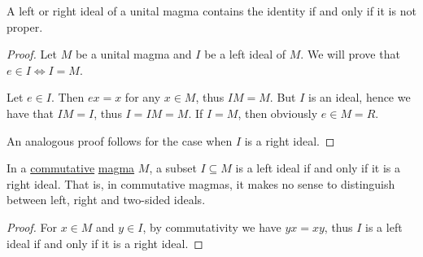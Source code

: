 \begin{proposition}\label{thm:proper_ideals_containing_identity}
  A left or right ideal of a unital magma contains the identity if and only if it is not proper.
\end{proposition}
\begin{proof}
  Let \( M \) be a unital magma and \( I \) be a left ideal of \( M \). We will prove that \( e \in I \iff I = M \).

  \begin{description}
    \Implies Let \( e \in I \). Then \( ex = x \) for any \( x \in M \), thus \( IM = M \). But \( I \) is an ideal, hence we have that \( IM = I \), thus \( I = IM = M \).
    \ImpliedBy If \( I = M \), then obviously \( e \in M = R \).
  \end{description}

  An analogous proof follows for the case when \( I \) is a right ideal.
\end{proof}

\begin{proposition}\label{thm:commutative_magma_ideals}
  In a \hyperref[def:algebraic_theory/commutativity]{commutative} \hyperref[def:magma/magma]{magma} \( M \), a subset \( I \subseteq M \) is a left ideal if and only if it is a right ideal. That is, in commutative magmas, it makes no sense to distinguish between left, right and two-sided ideals.
\end{proposition}
\begin{proof}
  For \( x \in M \) and \( y \in I \), by commutativity we have \( yx = xy \), thus \( I \) is a left ideal if and only if it is a right ideal.
\end{proof}

